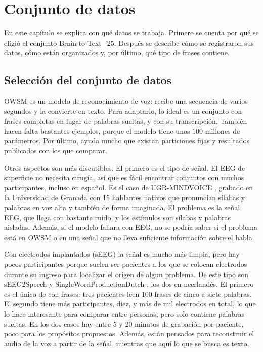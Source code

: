 
\chapter{Conjunto de datos}
\label{cap:datos}

En este capítulo se explica con qué datos se trabaja. Primero se cuenta por qué se eligió el conjunto Brain-to-Text~'25. Después se describe cómo se registraron sus datos, cómo están organizados y, por último, qué tipo de frases contiene.

\section{Selección del conjunto de datos}
\label{sec:seleccion-datos}

OWSM es un modelo de reconocimiento de voz: recibe una secuencia de varios segundos y la convierte en texto. Para adaptarlo, lo ideal es un conjunto con frases completas en lugar de palabras sueltas, y con su transcripción. También hacen falta bastantes ejemplos, porque el modelo tiene unos 100 millones de parámetros. Por último, ayuda mucho que existan particiones fijas y resultados publicados con los que comparar.

Otros aspectos son más discutibles. El primero es el tipo de señal. El EEG de superficie no necesita cirugía, así que es fácil encontrar conjuntos con muchos participantes, incluso en español. Es el caso de UGR-MINDVOICE \cite{valescortina2026}, grabado en la Universidad de Granada con 15 hablantes nativos que pronuncian sílabas y palabras en voz alta y también de forma imaginada. El problema es la señal EEG, que llega con bastante ruido, y los estímulos son sílabas y palabras aisladas. Además, si el modelo fallara con EEG, no se podría saber si el problema está en OWSM o en una señal que no lleva suficiente información sobre el habla. 

Con electrodos implantados (sEEG) la señal es mucho más limpia, pero hay pocos participantes porque suelen ser pacientes a los que se colocan electrodos durante su ingreso para localizar el origen de algun problema. De este tipo son sEEG2Speech \cite{kohler2022} y SingleWordProductionDutch \cite{verwoert2022}, los dos en neerlandés. El primero es el único de con frases: tres pacientes leen 100 frases de cinco a siete palabras. El segundo tiene más participantes, diez, y más de mil electrodos en total, lo que lo hace interesante para comparar entre personas, pero solo contiene palabras sueltas. En los dos casos hay entre 5 y 20 minutos de grabación por paciente, poco para los propósitos propuestos. Además, están pensados para reconstruir el audio de la voz a partir de la señal, mientras que aquí lo que se busca es texto.

